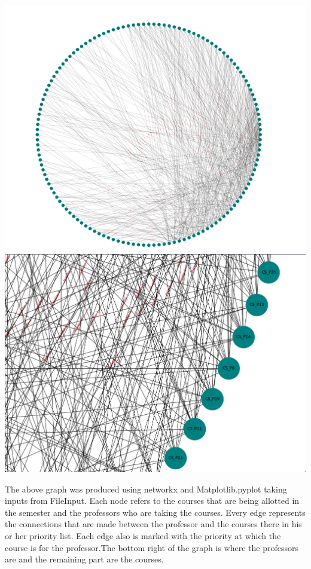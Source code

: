 \documentclass[a4paper,12pt]{article}
\begin{document}
\graphicspath{ {./images/} }
   \hspace{1cm}   \includegraphics[scale=1]{Graph1} \\
\includegraphics[scale =0.8]{Graph2}

The above graph was produced using networkx and Matplotlib.pyplot taking inputs from FileInput. Each node refers to the courses that are being allotted in the semester and the professors who are taking the courses. Every edge represents the connections that are made between the professor and the courses there in his or her priority list. Each edge also is marked with the priority at which the course is for the professor.The bottom right of the graph is where the professors are and the remaining part are the courses. \\ \\
\end{document}
